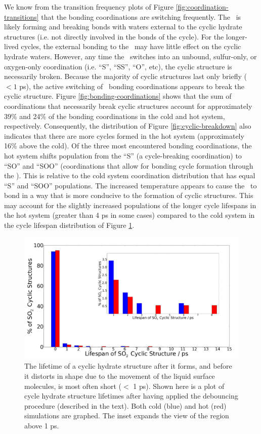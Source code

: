 We know from the transition frequency plots of Figure \ref{fig:coordination-transitions} that the bonding coordinations are switching frequently. The \suldiox~is likely forming and breaking bonds with waters external to the cyclic hydrate structures (i.e. not directly involved in the bonds of the cycle). For the longer-lived cycles, the external bonding to the \suldiox~may have little effect on the cyclic hydrate waters. However, any time the \suldiox~switches into an unbound, sulfur-only, or oxygen-only coordination (i.e. ``S'', ``SS'', ``O'', etc), the cyclic structure is necessarily broken. Because the majority of cyclic structures last only briefly ($<1$ ps), the active switching of \suldiox~bonding coordinations appears to break the cyclic structure. Figure \ref{fig:bonding-coordinations} shows that the sum of coordinations that necessarily break cyclic structures account for approximately 39\% and 24\% of the bonding coordinations in the cold and hot system, respectively. Consequently, the distribution of Figure \ref{fig:cyclic-breakdown} also indicates that there are more cycles formed in the hot system (approximately 16\% above the cold). Of the three most encountered bonding coordinations, the hot system shifts population from the ``S'' (a cycle-breaking coordination) to ``SO'' and ``SOO'' (coordinations that allow for bonding cycle formation through the \suldiox). This is relative to the cold system coordination distribution that has equal ``S'' and ``SOO'' populations. The increased temperature appears to cause the \suldiox~to bond in a way that is more conducive to the formation of cyclic structures. This may account for the slightly increased populations of the longer cycle lifespans in the hot system (greater than 4 ps in some cases) compared to the cold system in the cycle lifespan distribution of Figure \ref{fig:cycle-lifespans}. 

\begin{figure}[h!]
	\begin{center}
		\includegraphics[scale=1.0]{images/cycles/cyclic-lifespans-inset-small.png}
		\caption{The lifetime of a cyclic hydrate structure after it forms, and before it distorts in shape due to the movement of the liquid surface molecules, is most often short ($<$ 1 ps). Shown here is a plot of cycle hydrate structure lifetimes after having applied the debouncing procedure (described in the text). Both cold (blue) and hot (red) simulations are graphed. The inset expands the view of the region above 1 ps.}
		\label{fig:cycle-lifespans}
	\end{center}
\end{figure}
